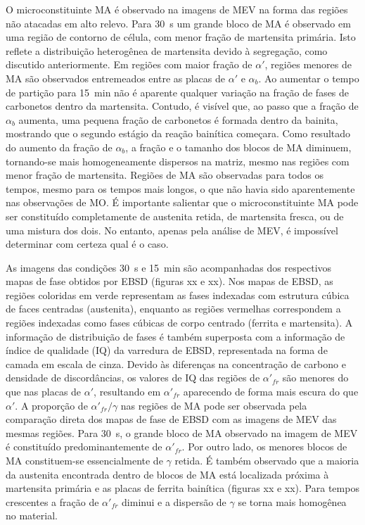 O microconstituinte MA é observado na imagens de MEV na forma das regiões não atacadas em alto relevo.
Para 30~s um grande bloco de MA é observado em uma região de contorno de célula, com menor fração de martensita primária. Isto reflete a distribuição heterogênea de martensita devido à segregação, como discutido anteriormente. Em regiões com maior fração de $\alpha'$, regiões menores de MA são observados entremeados entre as placas de $\alpha'$ e $\alpha_b$. Ao aumentar o tempo de partição para 15~min não é aparente qualquer variação na fração de fases de carbonetos dentro da martensita. Contudo, é visível que, ao passo que a fração de $\alpha_b$ aumenta, uma pequena fração de carbonetos é formada dentro da bainita, mostrando que o segundo estágio da reação bainítica começara. Como resultado do aumento da fração de $\alpha_b$, a fração e o tamanho dos blocos de MA diminuem, tornando-se mais homogeneamente dispersos na matriz, mesmo nas regiões com menor fração de martensita.
Regiões de MA são observadas para todos os tempos, mesmo para os tempos mais longos, o que não havia sido aparentemente nas observações de MO. É importante salientar que o microconstituinte MA pode ser constituído completamente de austenita retida, de martensita fresca, ou de uma mistura dos dois. No entanto, apenas pela análise de MEV, é impossível determinar com certeza qual é o caso.


As imagens das condições 30~s e 15~min são acompanhadas dos respectivos mapas de fase obtidos por EBSD (figuras xx e xx). Nos mapas de EBSD, as regiões coloridas em verde representam as fases indexadas com estrutura cúbica de faces centradas (austenita), enquanto as regiões vermelhas correspondem a regiões indexadas como fases cúbicas de corpo centrado (ferrita e martensita). A informação de distribuição de fases é também superposta com a informação de índice de qualidade (IQ) da varredura de EBSD, representada na forma de camada em escala de cinza. Devido às diferenças na concentração de carbono e densidade de discordâncias, os valores de IQ das regiões de $\alpha'_{fr}$ são menores do que nas placas de $\alpha'$, resultando em $\alpha'_{fr}$ aparecendo de forma mais escura do que $\alpha'$. A proporção de $\alpha'_{fr}/\gamma$ nas regiões de MA pode ser observada pela comparação direta dos mapas de fase de EBSD com as imagens de MEV das mesmas regiões. Para 30~s, o grande bloco de MA observado na imagem de MEV é constituído predominantemente de $\alpha'_{fr}$. Por outro lado, os menores blocos de MA constituem-se essencialmente de $\gamma$ retida. É também observado que a maioria da austenita encontrada dentro de blocos de MA está localizada próxima à martensita primária e as placas de ferrita bainítica (figuras xx e xx). Para tempos crescentes a fração de $\alpha'_{fr}$ diminui e a dispersão de $\gamma$ se torna mais homogênea no material.

